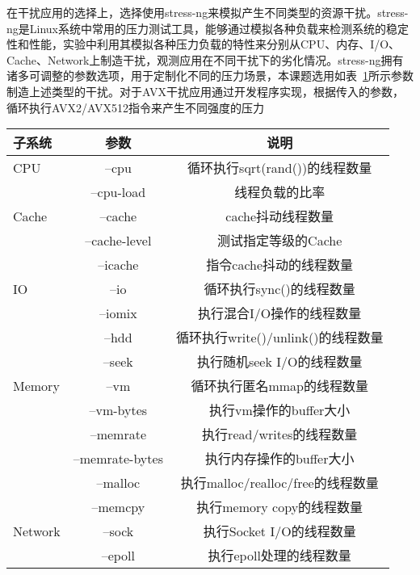 在干扰应用的选择上，选择使用stress-ng来模拟产生不同类型的资源干扰。stress-ng是Linux系统中常用的压力测试工具，能够通过模拟各种负载来检测系统的稳定性和性能，实验中利用其模拟各种压力负载的特性来分别从CPU、内存、I/O、Cache、Network上制造干扰，观测应用在不同干扰下的劣化情况。stress-ng拥有诸多可调整的参数选项，用于定制化不同的压力场景，本课题选用如表~\ref{tab:arg_list}所示参数制造上述类型的干扰。对于AVX干扰应用通过开发程序实现，根据传入的参数，循环执行AVX2/AVX512指令来产生不同强度的压力

\begin{table}
    \label{tab:arg_list}
    \footnotesize%
    \setlength{\tabcolsep}{4pt}%
    \renewcommand{\arraystretch}{1.5}%
    \centering
    \begin{tabular}{lcc}
        \hline
        子系统 & 参数 & 说明\\
        \hline
        CPU	    & --cpu	& 循环执行sqrt(rand())的线程数量\\
	            & --cpu-load & 线程负载的比率\\
        Cache	& --cache & cache抖动线程数量\\
	    & --cache-level	&测试指定等级的Cache\\
	    & --icache	&指令cache抖动的线程数量\\
        IO	    & --io	&循环执行sync()的线程数量\\
	            & --iomix	&执行混合I/O操作的线程数量\\
	            & --hdd	&循环执行write()/unlink()的线程数量\\
	            & --seek	&执行随机seek I/O的线程数量\\
        Memory	& --vm	&循环执行匿名mmap的线程数量\\
	            & --vm-bytes	&执行vm操作的buffer大小\\
	            & --memrate	&执行read/writes的线程数量\\
	            & --memrate-bytes	&执行内存操作的buffer大小\\
	            & --malloc	&执行malloc/realloc/free的线程数量\\
	            & --memcpy	&执行memory copy的线程数量\\
        Network	& --sock	&执行Socket I/O的线程数量\\
	            & --epoll	&执行epoll处理的线程数量\\
        \hline
    \end{tabular}
\end{table}

